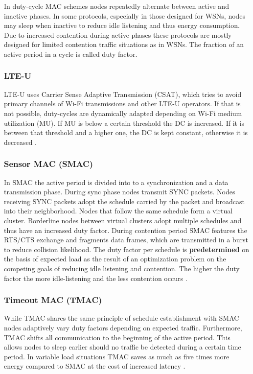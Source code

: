 In duty-cycle MAC schemes nodes repeatedly alternate between active and inactive phases. In some protocols, especially in those designed for WSNs, nodes may sleep when inactive to reduce idle listening and thus energy consumption. Due to increased contention during active phases these protocols are mostly designed for limited contention traffic situations as in WSNs. The fraction of an active period in a cycle is called duty factor.

\subsubsection{LTE-U}
\label{sec:lteu}
LTE-U uses Carrier Sense Adaptive Transmission (CSAT), which tries to avoid primary channels of Wi-Fi transmissions and other LTE-U operators. If that is not possible, duty-cycles are dynamically adapted depending on Wi-Fi medium utilization (MU). If MU is below a certain threshold the DC is increased. If it is between that threshold and a higher one, the DC is kept constant, otherwise it is decreased \cite{qualcomm15}.

\subsubsection{Sensor MAC (SMAC)}

In SMAC the active period is divided into to a synchronization and a data transmission phase. During sync phase nodes transmit SYNC packets. Nodes receiving SYNC packets adopt the schedule carried by the packet and broadcast into their neighborhood. Nodes that follow the same schedule form a virtual cluster. Borderline nodes between virtual clusters adopt multiple schedules and thus have an increased duty factor. During contention period SMAC features the RTS/CTS exchange and fragments data frames, which are transmitted in a burst to reduce collision likelihood. The duty factor per schedule is \textbf{predetermined} on the basis of expected load as the result of an optimization problem on the competing goals of reducing idle listening and contention. The higher the duty factor the more idle-listening and the less contention occurs \cite{Bachir10}\cite{Demirkol06}.

\subsubsection{Timeout MAC (TMAC)}

While TMAC shares the same principle of schedule establishment with SMAC nodes adaptively vary duty factors depending on expected traffic. Furthermore, TMAC shifts all communication to the beginning of the active period. This allows nodes to sleep earlier should no traffic be detected during a certain time period. In variable load situations TMAC saves as much as five times more energy compared to SMAC at the cost of increased latency \cite{Bachir10}. 

